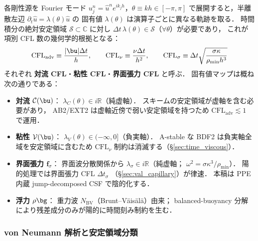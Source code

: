 各剛性源を Fourier モード $u_j^n = \hat{u}^n e^{ik_j h}$，$\theta\equiv kh\in[-\pi,\pi]$
で展開すると，半離散左辺 $\partial_t \hat{u} = \lambda(\theta)\hat{u}$ の
固有値 $\lambda(\theta)$ は演算子ごとに異なる軌跡を取る．
時間積分の絶対安定領域 $\mathcal{S}\subset\mathbb{C}$ に対し
$\Delta t\,\lambda(\theta)\in\mathcal{S}$（$\forall\theta$）が必要であり，
これが項別 CFL 数の幾何学的根拠となる：
\begin{equation}
  \mathrm{CFL}_{\mathrm{adv}} \equiv \frac{|\bu|\Delta t}{h},\qquad
  \mathrm{CFL}_{\nu} \equiv \frac{\nu\Delta t}{h^2},\qquad
  \mathrm{CFL}_{\sigma} \equiv \Delta t \sqrt{\frac{\sigma\kappa}{\rho_{\min} h^3}}
  \label{eq:cfl_number}
\end{equation}
それぞれ \textbf{対流 CFL}・\textbf{粘性 CFL}・\textbf{界面張力 CFL} と呼ぶ．
固有値マップは概ね次の通りである：
\begin{itemize}[leftmargin=2em]
  \item \textbf{対流 $\mathcal{C}(\bu)$}：
        $\lambda_C(\theta)\in i\mathbb{R}$（純虚軸）．
        スキームの安定領域が虚軸を含む必要があり，
        AB2/EXT2 は虚軸近傍で弱い安定領域を持つため $\mathrm{CFL}_{\mathrm{adv}}\lesssim 1$ で運用．
  \item \textbf{粘性 $\mathcal{V}(\bu)$}：
        $\lambda_V(\theta)\in(-\infty,0]$（負実軸）．
        A-stable な BDF2 は負実軸全域を安定領域に含むため
        $\mathrm{CFL}_{\nu}$ 制約は消滅する（§\ref{sec:time_viscous}）．
  \item \textbf{界面張力 $\bm{f}_\sigma$}：
        界面波分散関係から $\lambda_\sigma\in i\mathbb{R}$（純虚軸；
        $\omega^2 = \sigma\kappa^3/\rho_{\min}$）．
        陽的処理では界面張力 CFL $\Delta t_\sigma$
        （§\ref{sec:val_capillary}）が律速．
        本稿は PPE 内蔵 jump-decomposed CSF で陰的化する．
  \item \textbf{浮力 $\rho\bg$}：
        重力波 $N_{\mathrm{BV}}$（Brunt--Väisälä）由来；
        balanced-buoyancy 分解により残差成分のみが陽的に時間刻み制約を生む．
\end{itemize}

\subsubsection*{von Neumann 解析と安定領域分類}
\label{sec:von_neumann}

